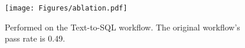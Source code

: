 {
\begin{figure}[h]
\begin{center}
\centerline{\texttt{[image: Figures/ablation.pdf]}}
\vspace{-0.1in}
{
Performed on the Text-to-SQL workflow. The original workflow's pass rate is 0.49.
}
\label{fig-ablation-study}
\end{center}
\end{figure}
}
